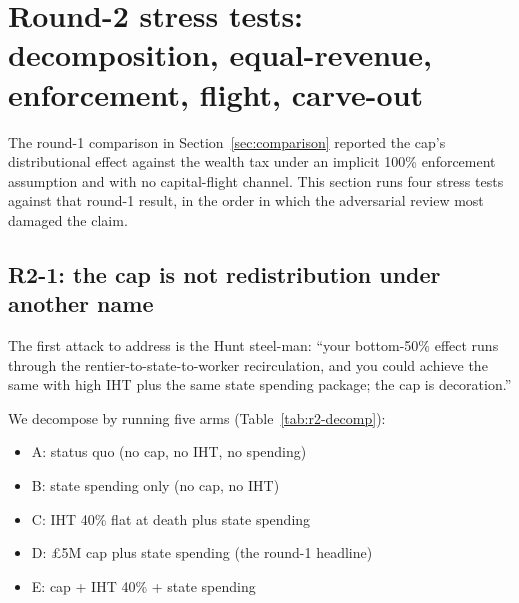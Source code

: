 \documentclass[11pt]{article}
\begin{document}
\section{Round-2 stress tests: decomposition, equal-revenue,
enforcement, flight, carve-out}
\label{sec:r2-decomp}

The round-1 comparison in Section~\ref{sec:comparison} reported the
cap's distributional effect against the wealth tax under an implicit
100\% enforcement assumption and with no capital-flight channel.
This section runs four stress tests against that round-1 result, in
the order in which the adversarial review most damaged the claim.

\subsection{R2-1: the cap is not redistribution under another name}

The first attack to address is the Hunt steel-man: ``your bottom-50\%
effect runs through the rentier-to-state-to-worker recirculation,
and you could achieve the same with high IHT plus the same state
spending package; the cap is decoration.''

We decompose by running five arms (Table~\ref{tab:r2-decomp}):

\begin{itemize}
\item A: status quo (no cap, no IHT, no spending)
\item B: state spending only (no cap, no IHT)
\item C: IHT 40\% flat at death plus state spending
\item D: \pounds 5M cap plus state spending (the round-1 headline)
\item E: cap + IHT 40\% + state spending
\end{itemize}
\end{document}
